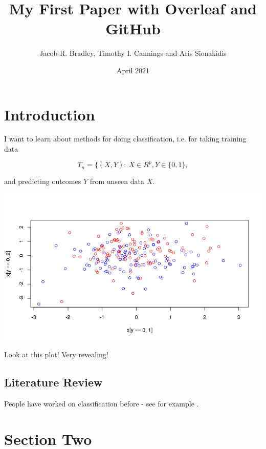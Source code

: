 \documentclass{article}
\title{My First Paper with Overleaf and GitHub}
\author{Jacob R. Bradley, Timothy I. Cannings and Aris Sionakidis}
\date{April 2021}
\begin{document}
\maketitle

\section{Introduction}
I want to learn about methods for doing classification, i.e. for taking training data 

\[ T_n = \{ (X,Y): \ X \in R^p, Y \in \{0,1\}, \]

and predicting outcomes $Y$ from unseen data $X$.

\includegraphics{results/figures/Rplot.png}

Look at this plot! Very revealing!

\subsection{Literature Review} 
People have worked on classification before - see for example \cite{cannings_random-projection_2017}.

\section{Section Two}



\end{document}
